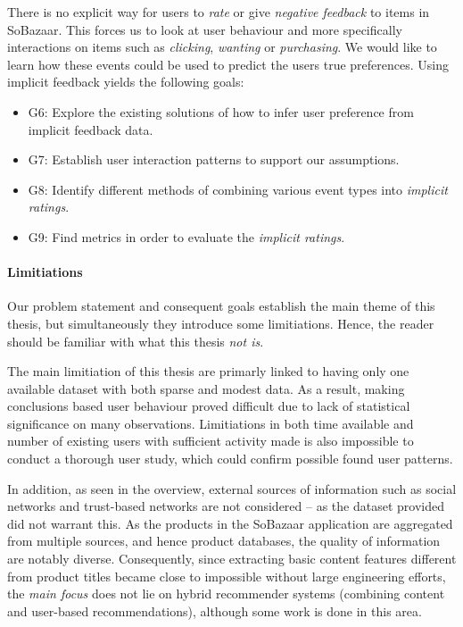 There is no explicit way for users to \textit{rate} or give \textit{negative
feedback} to items in SoBazaar. This forces us to look at user behaviour and
more specifically interactions on items such as \textit{clicking},
\textit{wanting} or \textit{purchasing}. We would like to learn how these
events could be used to predict the users true preferences. Using implicit
feedback yields the following goals:

\begin{itemize}
  \item G6: Explore the existing solutions of how to infer user preference from
  implicit feedback data.
  \item G7: Establish user interaction patterns to support our assumptions.
  \item G8: Identify different methods of combining various event types into
  \emph{implicit ratings}.
  \item G9: Find metrics in order to evaluate the \emph{implicit ratings}.
\end{itemize}

\paragraph{Limitiations} Our problem statement and consequent goals establish
the main theme of this thesis, but simultaneously they introduce some
limitiations. Hence, the reader should be familiar with what this thesis
\textit{not is}.

The main limitiation of this thesis are primarly linked to having only one
available dataset with both sparse and modest data. As a result, making
conclusions based user behaviour proved difficult due to lack of statistical
significance on many observations. Limitiations in both time available and
number of existing users with sufficient activity made is also impossible to
conduct a thorough user study, which could confirm possible found user
patterns. 

In addition, as seen in the overview, external sources of information such as
social networks and trust-based networks are not considered – as the dataset
provided did not warrant this. As the products in the SoBazaar application are
aggregated from multiple sources, and hence product databases, the quality of
information are notably diverse. Consequently, since extracting basic content
features different from product titles became close to impossible without large
engineering efforts, the \textit{main focus} does not lie on hybrid recommender
systems (combining content and user-based recommendations), although some work
is done in this area.

